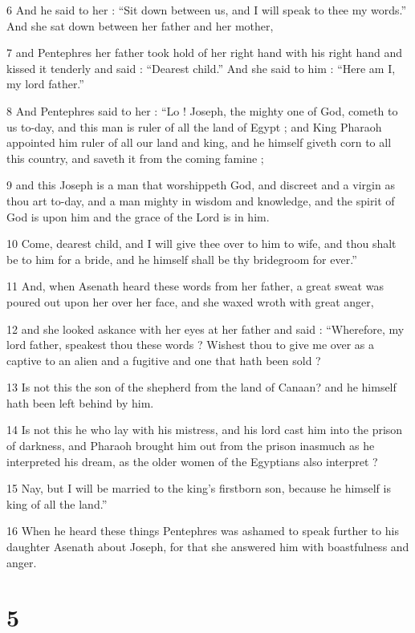 6 And he said to her : “Sit down between us, and I will speak to thee my words.” And she sat down between her father and her mother, 

7 and Pentephres her father took hold of her right hand with his right hand and kissed it tenderly and said : “Dearest child.” And she said to him : “Here am I, my lord father.” 

8 And Pentephres said to her : “Lo ! Joseph, the mighty one of God, cometh to us to-day, and this man is ruler of all the land of Egypt ; and King Pharaoh appointed him ruler of all our land and king, and he himself giveth corn to all this country, and saveth it from the coming famine ; 

9 and this Joseph is a man that worshippeth God, and discreet and a virgin as thou art to-day, and a man mighty in wisdom and knowledge, and the spirit of God is upon him and the grace of the Lord is in him. 

10 Come, dearest child, and I will give thee over to him to wife, and thou shalt be to him for a bride, and he himself shall be thy bridegroom for ever.”

11 And, when Asenath heard these words from her father, a great sweat was poured out upon her over her face, and she waxed wroth with great anger, 

12 and she looked askance with her eyes at her father and said : “Wherefore, my lord father, speakest thou these words ? Wishest thou to give me over as a captive to an alien and a fugitive and one that hath been sold ? 

13 Is not this the son of the shepherd from the land of Canaan? and he himself hath been left behind by him. 

14 Is not this he who lay with his mistress, and his lord cast him into the prison of darkness, and Pharaoh brought him out from the prison inasmuch as he interpreted his dream, as the older women of the Egyptians also interpret ? 

15 Nay, but I will be married to the king's firstborn son, because he himself is king of all the land.” 

16 When he heard these things Pentephres was ashamed to speak further to his daughter Asenath about Joseph, for that she answered him with boastfulness and anger. 

\chapter{5}

